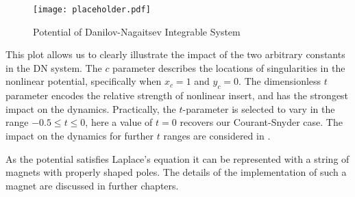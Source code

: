 \begin{figure} \label{fig:DNpot}
	\centering
	\texttt{[image: placeholder.pdf]}
	\caption{Potential of Danilov-Nagaitsev Integrable System}
\end{figure}

This plot allows us to clearly illustrate the impact of the two arbitrary constants in the DN system. The $c$ parameter describes the locations of singularities in the nonlinear potential, specifically when $x_c = 1$ and $y_c = 0$. The dimensionless $t$ parameter encodes the relative strength of nonlinear insert, and has the strongest impact on the dynamics. Practically, the $t$-parameter is selected to vary in the range $-0.5 \leq t \leq 0$, here a value of $t=0$ recovers our Courant-Snyder case. The impact on the dynamics for further $t$ ranges are considered in \cite{MitchellBiforcation}. 

As the potential satisfies Laplace's equation it can be represented with a string of magnets with properly shaped poles. The details of the implementation of such a magnet are discussed in further chapters.

